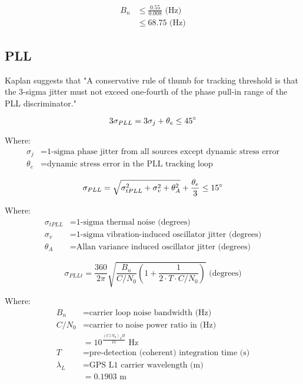 \begin{align*}
B_n &\leq \frac{0.55}{0.008} \text{ (Hz)}\\
    &\leq 68.75 \text{ (Hz)}
\end{align*}

\subsection{PLL}
Kaplan suggests that "A conservative rule of thumb for tracking threshold is that the 3-sigma jitter must not exceed one-fourth of the phase pull-in range of the PLL discriminator." %

\begin{equation}
3 \sigma_{PLL} = 3 \sigma_j +\theta_e \leq 45 \degree
\end{equation}

Where:
\begin{align*}
\sigma_j &= \text{1-sigma phase jitter from all sources except dynamic stress error} \\
\theta_e &= \text{dynamic stress error in the PLL tracking loop}
\end{align*}

\begin{equation}
\sigma_{PLL} = \sqrt{\sigma^2_{tPLL} + \sigma^2_v+ \theta^2_A} + \frac{\theta_e}{3} \leq 15 \degree 
\end{equation}

Where:
\begin{align*}
\sigma_{tPLL} &= \text{1-sigma thermal noise (degrees)}\\
\sigma_v &= \text{1-sigma vibration-induced oscillator jitter (degrees)}\\
\theta_A &= \text{Allan variance induced oscillator jitter (degrees)}
\end{align*}


\begin{equation}
\sigma_{PLLt} = \frac{360}{2 \pi} \sqrt{\frac{B_n}{C/N_0}(1+\frac{1}{2 \cdot T \cdot C/N_0})} \text{ (degrees)}
\end{equation}

Where:
\begin{align*}
B_n &= \text{carrier loop noise bandwidth (Hz)} \\
C/N_0 &= \text{carrier to noise power ratio in (Hz)} \\
&=10^\frac{(C/N_0)_dB}{10} \text{ Hz}\\
T &= \text{pre-detection (coherent) integration time (s)} \\
\lambda_L &= \text{GPS L1 carrier wavelength (m)}\\
&= 0.1903 \text{ m}
\end{align*}


